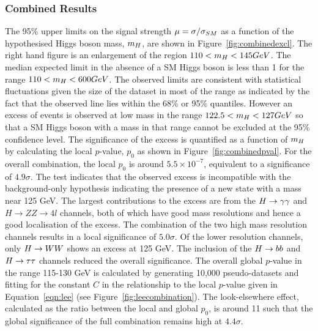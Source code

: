 \subsubsection{Combined Results}
\label{sec:combinedsearchresults}
The 95\% upper limits on the signal strength $\mu=\sigma/\sigma_{SM}$ as a function 
of the hypothesised Higgs boson mass, $m_{H}$, are shown in 
Figure~\ref{fig:combinedexcl}. The right hand figure is an enlargement of
the region $110 < m_{H}  < 145 GeV$. The median expected limit in the absence
of a SM Higgs boson is less than 1 for the range $110< m_{H}<600 GeV$. 
The observed limits are consistent with statistical fluctuations given the 
size of the dataset in most of the range as indicated by the fact that the 
observed line lies within the 68\% or 95\% quantiles. However an
excess of events is observed at low mass in the range $122.5  < m_{H} < 127 GeV$
so that a SM Higgs boson with a mass in that range cannot be excluded
at the 95\% confidence level. The significance of the excess is quantified as a function
of $m_{H}$ by calculating the local $p$-value, $p_{0}$ as shown in Figure~\ref{fig:combinedpval}. 
For the overall combination, the local $p_{0}$ is around $5.5\times10^{-7}$, 
equivalent to a significance of $4.9\sigma$. The test indicates that the observed excess 
is incompatible with the background-only hypothesis indicating the presence of 
a new state with a mass near 125 GeV.
The largest contributions to the excess are
from the $H\rightarrow\gamma\gamma$ and $H\rightarrow ZZ\rightarrow4l$ channels, 
both of which have good mass resolutions and hence a good localisation
of the excess. The combination of the two 
high mass resolution channels results in a local significance of $5.0\sigma$. 
Of the lower resolution channels, only $H\rightarrow WW$ shows an excess at 125 GeV. The inclusion
of the $H\rightarrow bb$ and $H\rightarrow\tau\tau$ channels reduced the overall significance.
The overall global $p$-value in the range 115-130 GeV is calculated by 
generating 10,000 pseudo-datasets and fitting for the constant $C$ in 
the relationship to the local $p$-value given in Equation~\ref{eqn:lee} 
(see Figure~\ref{fig:leecombination}). The
look-elsewhere effect, calculated as the ratio between the local and global $p_{0}$, 
is around 11 such that the global significance of the full combination remains high at $4.4\sigma$.

